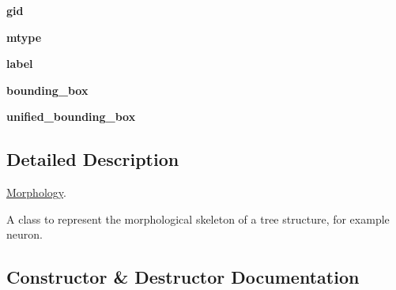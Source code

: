 \begin{DoxyCompactItemize}
\item 
{\bfseries gid}\hypertarget{classmeshy_1_1neuromorphovis_1_1skeleton_1_1structure_1_1morphology_1_1Morphology_a1868f645eeff13f905c0275acb4703a0}{}\label{classmeshy_1_1neuromorphovis_1_1skeleton_1_1structure_1_1morphology_1_1Morphology_a1868f645eeff13f905c0275acb4703a0}

\item 
{\bfseries mtype}\hypertarget{classmeshy_1_1neuromorphovis_1_1skeleton_1_1structure_1_1morphology_1_1Morphology_ac28f00d74f13646c96ee5fe4410298ec}{}\label{classmeshy_1_1neuromorphovis_1_1skeleton_1_1structure_1_1morphology_1_1Morphology_ac28f00d74f13646c96ee5fe4410298ec}

\item 
{\bfseries label}\hypertarget{classmeshy_1_1neuromorphovis_1_1skeleton_1_1structure_1_1morphology_1_1Morphology_a20b92735ff004c30bf36d807abe98504}{}\label{classmeshy_1_1neuromorphovis_1_1skeleton_1_1structure_1_1morphology_1_1Morphology_a20b92735ff004c30bf36d807abe98504}

\item 
{\bfseries bounding\+\_\+box}\hypertarget{classmeshy_1_1neuromorphovis_1_1skeleton_1_1structure_1_1morphology_1_1Morphology_a19a204916e41b16d2a362d3d1e87f85b}{}\label{classmeshy_1_1neuromorphovis_1_1skeleton_1_1structure_1_1morphology_1_1Morphology_a19a204916e41b16d2a362d3d1e87f85b}

\item 
{\bfseries unified\+\_\+bounding\+\_\+box}\hypertarget{classmeshy_1_1neuromorphovis_1_1skeleton_1_1structure_1_1morphology_1_1Morphology_a62aff5015b4ebc19814ab057c2e99253}{}\label{classmeshy_1_1neuromorphovis_1_1skeleton_1_1structure_1_1morphology_1_1Morphology_a62aff5015b4ebc19814ab057c2e99253}

\end{DoxyCompactItemize}


\subsection{Detailed Description}
\hyperlink{classmeshy_1_1neuromorphovis_1_1skeleton_1_1structure_1_1morphology_1_1Morphology}{Morphology}. 

\begin{DoxyVerb}A class to represent the morphological skeleton of a tree structure, for example neuron.
\end{DoxyVerb}
 

\subsection{Constructor \& Destructor Documentation}
